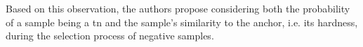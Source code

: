 Based on this observation, the authors propose 
considering both the probability of a sample being a \ac{tn} 
and the sample's similarity to the anchor, i.e. its hardness, during the selection process of negative samples.





